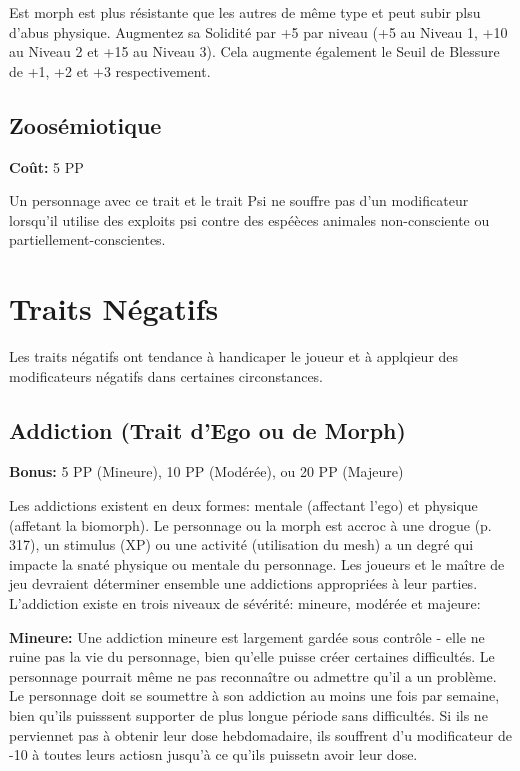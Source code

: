 Est morph est plus résistante que les autres de même type et peut subir plsu d'abus physique. Augmentez sa Solidité par +5 par niveau (+5 au Niveau 1, +10 au Niveau 2 et +15 au Niveau 3). Cela augmente également le Seuil de Blessure de +1, +2 et +3 respectivement. 

\subsection{Zoosémiotique} \label{sec:traits-zoosemiotics} 

\textbf{Coût:} 5 PP 

Un personnage avec ce trait et le trait Psi ne souffre pas d'un modificateur lorsqu'il utilise des exploits psi contre des espéèces animales non-consciente ou partiellement-conscientes. 

\section{Traits Négatifs} \label{sec:negative-traits} 

Les traits négatifs ont tendance à handicaper le joueur et à applqieur des modificateurs négatifs dans certaines circonstances. 

\subsection{Addiction (Trait d'Ego ou de Morph)} \label{sec:traits-addiction} 

\textbf{Bonus:} 5 PP (Mineure), 10 PP (Modérée), ou 20 PP (Majeure) 

\textbf{} Les addictions existent en deux formes: mentale (affectant l'ego) et physique (affetant la biomorph). Le personnage ou la morph est accroc à une drogue (p. 317), un stimulus (XP) ou une activité (utilisation du mesh) a un degré qui impacte la snaté physique ou mentale du personnage. Les joueurs et le maître de jeu devraient déterminer ensemble une addictions appropriées à leur parties. L'addiction existe en trois niveaux de sévérité: mineure, modérée et majeure: 

\textbf{Mineure:} Une addiction mineure est largement gardée sous contrôle - elle ne ruine pas la vie du personnage, bien qu'elle puisse créer certaines difficultés. Le personnage pourrait même ne pas reconnaître ou admettre qu'il a un problème. Le personnage doit se soumettre à son addiction au moins une fois par semaine, bien qu'ils puisssent supporter de plus longue période sans difficultés. Si ils ne perviennet pas à obtenir leur dose hebdomadaire, ils souffrent d'u modificateur de -10 à toutes leurs actiosn jusqu'à ce qu'ils puissetn avoir leur dose. 

